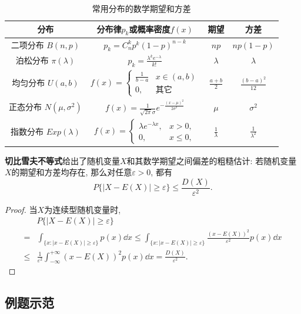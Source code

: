\documentclass[11pt]{ctexart}
\begin{document}
\begin{table}[H]
	\centering
	\begin{tabular}{c|c|c|c}
	\toprule
		分布 & 分布律$p_k$或概率密度$f(x)$ & 期望 & 方差 \\
	\midrule
		二项分布 $B(n,p)$ & $p_k = C_n^k p^k (1-p)^{n-k}$ & $np$ & $np(1-p)$ \\
	\midrule
		泊松分布 $\pi(\lambda)$ & $p_k = \frac{\lambda^k e^{-\lambda}}{k !}$ & $\lambda$ & $\lambda$ \\
	\midrule
		均匀分布 $U(a, b)$ & $f(x) = \begin{cases} \frac{1}{b-a} & x \in (a, b) \\ 0, &\textbf{其它} \end{cases}$ & $\frac{a+b}2$ & $\frac{(b-a)^2}{12}$  \\
	\midrule 
		正态分布 $N(\mu,\sigma^2)$ & $f(x) = \frac{1}{\sqrt{2 \pi} \sigma} e^{- \frac{(x-\mu)^2}{2 \sigma^2}}$ & $\mu$ & $\sigma^2$ \\
	\midrule 
		指数分布 $Exp(\lambda)$ & $f(x) = \begin{cases}\lambda e^{-\lambda x}, & x > 0, \\
			0, & x\leq 0, \end{cases}$ & $\frac{1}{\lambda}$ & $\frac{1}{\lambda^2}$ \\
	\bottomrule
	\end{tabular}
	\caption{常用分布的数学期望和方差}
\end{table}

\textbf{切比雪夫不等式}给出了随机变量$X$和其数学期望之间偏差的粗糙估计: 若随机变量$X$的期望和方差均存在, 那么对任意$\varepsilon > 0$, 都有
\begin{equation*}
	P\{|X - E(X)| \geq \varepsilon\} \leq \frac{D(X)}{\varepsilon^2}. 
\end{equation*}
\begin{proof}
	当$X$为连续型随机变量时, 
	\begin{align*}
		& P\{|X - E(X)| \geq \varepsilon\} \\
		= & \int_{\{x \colon |x - E(X)| \geq \varepsilon\}} p(x) \dd x
		\leq  \int_{\{x \colon |x - E(X)| \geq \varepsilon\}} \frac{(x-E(X))^2}{\varepsilon^2} p(x) \dd x \\
		\leq & \frac{1}{\varepsilon^2} \int_{-\infty}^{+\infty} (x-E(X))^2 p(x) \dd x
		= \frac{D(X)}{\varepsilon^2}. 
	\end{align*}
\end{proof}

\subsection{例题示范}
\end{document}
